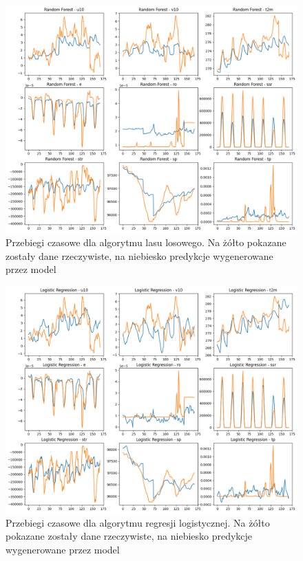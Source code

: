 \begin{figure}[H]
    \centering
    \includegraphics[width=\textwidth]{images/random_forest_week.png}
    \caption{Przebiegi czasowe dla algorytmu lasu losowego. Na żółto pokazane zostały dane 
    rzeczywiste, na niebiesko predykcje wygenerowane przez model}
    \label{forest-week}
\end{figure}

\begin{figure}[H]
    \centering
    \includegraphics[width=\textwidth]{images/regression_week.png}
    \caption{Przebiegi czasowe dla algorytmu regresji logistycznej. Na żółto pokazane zostały dane 
    rzeczywiste, na niebiesko predykcje wygenerowane przez model}
    \label{regression-week}
\end{figure}

